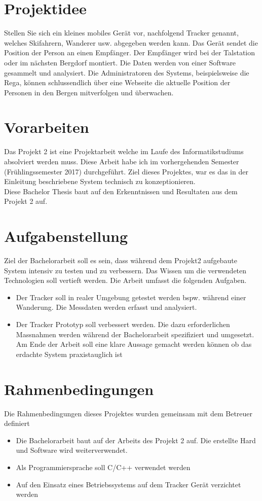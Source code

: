 \documentclass[11pt,english,german]{report}
\theoremstyle{definition}
\begin{document}
\newpage
\section{Projektidee}
Stellen Sie sich ein kleines mobiles Gerät vor, nachfolgend Tracker genannt, welches Skifahrern, Wanderer usw. abgegeben werden kann. Das Gerät sendet die Position der Person an einen Empfänger. Der Empfänger wird bei der Talstation oder im nächsten Bergdorf montiert. Die Daten werden von einer Software gesammelt und analysiert. Die Administratoren des Systems, beispielsweise die Rega, können schlussendlich über eine Webseite die aktuelle Position der Personen in den Bergen mitverfolgen und überwachen.

\section{Vorarbeiten}
Das Projekt 2 ist eine Projektarbeit welche im Laufe des Informatikstudiums absolviert werden muss. Diese Arbeit habe ich im vorhergehenden Semester (Frühlingssemester 2017) durchgeführt. Ziel dieses Projektes, war es das in der Einleitung beschriebene System technisch zu konzeptionieren.\\[0.3cm]
Diese Bachelor Thesis baut auf den Erkenntnissen und Resultaten aus dem Projekt 2 auf.

\section{Aufgabenstellung}
Ziel der Bachelorarbeit soll es sein, dass während dem Projekt2 aufgebaute System intensiv zu testen und zu verbessern. Das Wissen um die verwendeten Technologien soll vertieft werden. Die Arbeit umfasst die folgenden Aufgaben.
\begin{itemize}
\item
Der Tracker soll in realer Umgebung getestet werden bspw. während einer Wanderung. Die Messdaten werden erfasst und analysiert.
\item Der Tracker Prototyp soll verbessert werden. Die dazu erforderlichen Massnahmen werden während der Bachelorarbeit spezifiziert und umgesetzt. Am Ende der Arbeit soll eine klare Aussage gemacht werden können ob das erdachte System praxistauglich ist
\end{itemize}

\section{Rahmenbedingungen}
Die Rahmenbedingungen dieses Projektes wurden gemeinsam mit dem Betreuer definiert
\begin{itemize}
\item Die Bachelorarbeit baut auf der Arbeits des Projekt 2 auf. Die erstellte Hard und Software wird weiterverwendet.
\item Als Programmiersprache soll C/C++ verwendet werden
\item Auf den Einsatz eines Betriebssystems auf dem Tracker Gerät verzichtet werden
\end{itemize}
\end{document}
